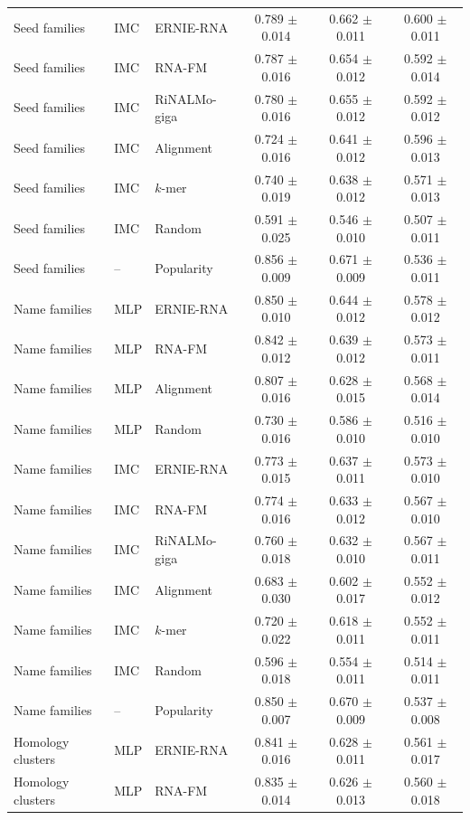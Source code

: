 \begin{longtable}{lllccc}
Seed families & IMC & ERNIE-RNA & 0.789 $\pm$ 0.014 & 0.662 $\pm$ 0.011 & 0.600 $\pm$ 0.011\\
Seed families & IMC & RNA-FM & 0.787 $\pm$ 0.016 & 0.654 $\pm$ 0.012 & 0.592 $\pm$ 0.014\\
Seed families & IMC & RiNALMo-giga & 0.780 $\pm$ 0.016 & 0.655 $\pm$ 0.012 & 0.592 $\pm$ 0.012\\
Seed families & IMC & Alignment & 0.724 $\pm$ 0.016 & 0.641 $\pm$ 0.012 & 0.596 $\pm$ 0.013\\
Seed families & IMC & $k$-mer & 0.740 $\pm$ 0.019 & 0.638 $\pm$ 0.012 & 0.571 $\pm$ 0.013\\
Seed families & IMC & Random & 0.591 $\pm$ 0.025 & 0.546 $\pm$ 0.010 & 0.507 $\pm$ 0.011\\
Seed families & -- & Popularity & 0.856 $\pm$ 0.009 & 0.671 $\pm$ 0.009 & 0.536 $\pm$ 0.011\\
\midrule
Name families & MLP & ERNIE-RNA & 0.850 $\pm$ 0.010 & 0.644 $\pm$ 0.012 & 0.578 $\pm$ 0.012\\
Name families & MLP & RNA-FM & 0.842 $\pm$ 0.012 & 0.639 $\pm$ 0.012 & 0.573 $\pm$ 0.011\\
Name families & MLP & Alignment & 0.807 $\pm$ 0.016 & 0.628 $\pm$ 0.015 & 0.568 $\pm$ 0.014\\
Name families & MLP & Random & 0.730 $\pm$ 0.016 & 0.586 $\pm$ 0.010 & 0.516 $\pm$ 0.010\\
Name families & IMC & ERNIE-RNA & 0.773 $\pm$ 0.015 & 0.637 $\pm$ 0.011 & 0.573 $\pm$ 0.010\\
Name families & IMC & RNA-FM & 0.774 $\pm$ 0.016 & 0.633 $\pm$ 0.012 & 0.567 $\pm$ 0.010\\
Name families & IMC & RiNALMo-giga & 0.760 $\pm$ 0.018 & 0.632 $\pm$ 0.010 & 0.567 $\pm$ 0.011\\
Name families & IMC & Alignment & 0.683 $\pm$ 0.030 & 0.602 $\pm$ 0.017 & 0.552 $\pm$ 0.012\\
Name families & IMC & $k$-mer & 0.720 $\pm$ 0.022 & 0.618 $\pm$ 0.011 & 0.552 $\pm$ 0.011\\
Name families & IMC & Random & 0.596 $\pm$ 0.018 & 0.554 $\pm$ 0.011 & 0.514 $\pm$ 0.011\\
Name families & -- & Popularity & 0.850 $\pm$ 0.007 & 0.670 $\pm$ 0.009 & 0.537 $\pm$ 0.008\\
\midrule
Homology clusters & MLP & ERNIE-RNA & 0.841 $\pm$ 0.016 & 0.628 $\pm$ 0.011 & 0.561 $\pm$ 0.017\\
Homology clusters & MLP & RNA-FM & 0.835 $\pm$ 0.014 & 0.626 $\pm$ 0.013 & 0.560 $\pm$ 0.018\\

\end{longtable}
